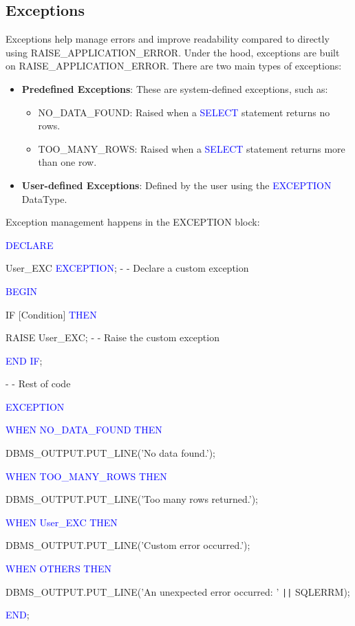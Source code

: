 \subsection{Exceptions}
\begin{tcolorbox}[title = Definition]
Exceptions help manage errors and improve readability compared to directly using RAISE\_APPLICATION\_ERROR. Under
the hood, exceptions are built on RAISE\_APPLICATION\_ERROR. There are two main types of exceptions:
\begin{itemize}
    \item \textbf{Predefined Exceptions}: These are system-defined exceptions, such as:
        \begin{itemize}
            \item NO\_DATA\_FOUND: Raised when a \textcolor{blue}{SELECT} statement returns no rows.
            \item TOO\_MANY\_ROWS: Raised when a \textcolor{blue}{SELECT} statement returns more than one row.
        \end{itemize}
    \item \textbf{User-defined Exceptions}: Defined by the user using the \textcolor{blue}{EXCEPTION} DataType.
\end{itemize}
\end{tcolorbox}

\begin{tcolorbox}[title = Syntax Exception]
Exception management happens in the EXCEPTION block:

\textcolor{blue}{DECLARE}

User\_EXC \textcolor{blue}{EXCEPTION}; \textcolor{commentgray}{- - Declare a custom exception}

\textcolor{blue}{BEGIN}

IF [Condition] \textcolor{blue}{THEN}

RAISE User\_EXC; \textcolor{commentgray}{- - Raise the custom exception}

\textcolor{blue}{END IF};

\textcolor{commentgray}{- - Rest of code}

\textcolor{blue}{EXCEPTION}

\textcolor{blue}{WHEN NO\_DATA\_FOUND THEN}

DBMS\_OUTPUT.PUT\_LINE(\textcolor{messagegreen}{'No data found.'});

\textcolor{blue}{WHEN TOO\_MANY\_ROWS THEN}

DBMS\_OUTPUT.PUT\_LINE(\textcolor{messagegreen}{'Too many rows returned.'});

\textcolor{blue}{WHEN User\_EXC THEN}

DBMS\_OUTPUT.PUT\_LINE(\textcolor{messagegreen}{'Custom error occurred.'});

\textcolor{blue}{WHEN OTHERS THEN}

DBMS\_OUTPUT.PUT\_LINE(\textcolor{messagegreen}{'An unexpected error occurred: '} \texttt{||} SQLERRM);

\textcolor{blue}{END};
\end{tcolorbox}


